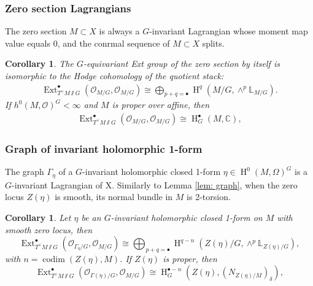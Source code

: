 \documentclass[12pt]{amsart}
\newtheorem{corollary}[theorem]{Corollary}
\theoremstyle{definition}
\theoremstyle{remark}
\numberwithin{equation}{section}
\newcommand{\CC}{\mathbb{C}}
\newcommand{\LL}{\mathbb{L}}
\newcommand{\shO}{\mathcal{O}}
\newcommand{\codim}{\operatorname{codim}}
\newcommand{\Ext}{\operatorname{Ext}}
\newcommand{\Hdot}{\operatorname{H}}
\begin{document}
\subsubsection{Zero section Lagrangians}
The zero section $M\subset X$ is always a $G$-invariant Lagrangian whose moment map value equals $0$, and the conrmal sequence of $M\subset X$ splits. 
\begin{corollary}\label{cor:eqExt}
    The $G$-equivariant Ext group of the zero section by itself is isomorphic to the Hodge cohomology of the quotient stack: 
\begin{align}\label{GEXT=H1}
    \Ext_{T^{\vee}M\sslash  G}^{\bullet}(\shO_{M/G}, \shO_{M/G})\cong \bigoplus_{p+q=\bullet}\Hdot^{q}(M/G, \wedge^p \LL_{M/G}).
\end{align}
If $h^0(M, \shO)^G<\infty$ and $M$ is proper over affine, then
\begin{align}\label{GEXT=H2}
    \Ext_{T^{\vee}M\sslash  G}^{\bullet}(\shO_{M/G}, \shO_{M/G})\cong \Hdot^{\bullet}_G(M, \CC),
\end{align}
    \end{corollary}
\subsubsection{Graph of invariant holomorphic 1-form} The graph $\Gamma_{\eta}$ of a $G$-invariant holomorphic closed 1-form $\eta\in \Hdot^0(M, \Omega)^G$ is a $G$-invariant Lagrangian of X. Similarly to Lemma \ref{lem: graph}, when the zero locus $Z(\eta)$ is smooth, its normal bundle in $M$ is 2-torsion.
\begin{corollary}\label{cor: eqgraph}
    Let $\eta$ be an $G$-invariant holomorphic closed 1-form on $M$ with smooth zero locus, then 
    $$\Ext_{T^{\vee}M\sslash  G}^{\bullet}(\shO_{\Gamma_{\eta}/G}, \shO_{M/G})\cong \bigoplus_{p+q=\bullet} \Hdot^{q-n}(Z(\eta)/G, \wedge^p\LL_{Z(\eta)/G}),$$
    with $n=\codim(Z(\eta), M)$.
    If $Z(\eta)$ is proper, then 
    $$\Ext_{T^{\vee}M\sslash  G}^{\bullet}(\shO_{\Gamma(\eta)/G}, \shO_{M/G})\cong \Hdot^{\bullet-n}_G(Z(\eta), (N_{Z(\eta)/M})_{\delta}),$$
\end{corollary}
\end{document}
